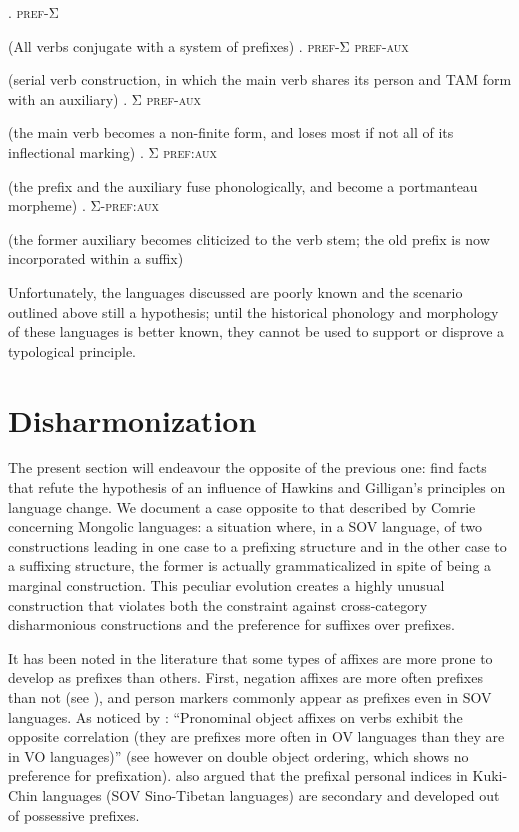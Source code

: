 \documentclass[oldfontcommands,twoside,a4paper,12pt]{article}
\newcommand{\grec}[1]{{\mleccha #1}}
\begin{document}
 \begin{exe}
\ex 
{}. \textsc{pref}-\grec{Σ} 

(All verbs conjugate with a system of prefixes)
. \textsc{pref}-\grec{Σ} \textsc{pref}-\textsc{aux}

 (serial verb construction, in which the main verb shares its person and TAM form with an auxiliary)
. \grec{Σ} \textsc{pref}-\textsc{aux}

 (the main verb becomes a non-finite form, and loses most if not all of its inflectional marking)
. \grec{Σ} \textsc{pref}:\textsc{aux} 

(the prefix and the auxiliary fuse phonologically, and become a portmanteau morpheme)
. \grec{Σ}-\textsc{pref}:\textsc{aux}

 (the former auxiliary becomes cliticized to the verb stem; the old prefix is now incorporated within a suffix)
\end{exe}

Unfortunately, the languages discussed are poorly known and the scenario outlined above still a hypothesis; until the historical phonology and morphology of these languages is better known, they cannot be used to support or disprove a typological principle.



\section{Disharmonization } \label{sec:japhug}
The present section will endeavour the opposite of the previous one: find facts that  refute the hypothesis of an influence of Hawkins and Gilligan's principles on language change. We document a case opposite to that described by Comrie concerning Mongolic languages: a situation where, in a SOV language, of two constructions leading in one case to a prefixing structure and in the other case to a suffixing structure, the former is actually grammaticalized in spite of being a marginal construction. This peculiar evolution creates a highly unusual  construction that violates both the constraint against cross-category disharmonious constructions and the preference for suffixes over prefixes.

It has been noted in the literature that some types of affixes are more prone to develop as prefixes than others. First, negation affixes are more often prefixes than not (see \citealt{bybee90asymmetries}), and person markers commonly appear as prefixes even in SOV languages. As noticed by \citet[1053]{dryer95wo}: ``Pronominal object affixes on verbs exhibit the opposite correlation (they are prefixes more often in OV languages than they are in VO languages)'' (see however \citealt{gensler03object} on double object ordering, which shows no preference for prefixation). \citet{delancey11prefixes} also argued that the prefixal personal indices in Kuki-Chin languages (SOV Sino-Tibetan languages) are secondary and developed out of possessive prefixes.
\end{document}
